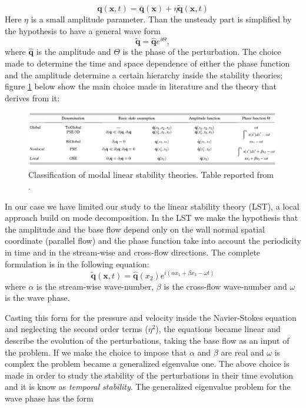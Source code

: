 $$ \mathbf{q} (\mathbf{x},t)= \overline{\mathbf{q}} (\mathbf{x}) + \eta \widetilde{\mathbf{q}} (\mathbf{x},t) $$
Here $\eta$ is a small amplitude parameter. Than the unsteady part is simplified by the hypothesis to have a general wave form
$$  \widetilde{\mathbf{q}} =  \widehat{\mathbf{q}} e^{i\Theta}, $$
where $\widehat{\mathbf{q}}$ is the amplitude and $\Theta$ is the phase of the perturbation.
The choice made to determine the time and space dependence of either the phase function and the amplitude determine a certain hierarchy inside the stability theories; figure \ref{fig:table} below show the main choice made in literature and the theory that derives from it:

\begin{figure}[h]
	\centering
	\includegraphics[width=1\linewidth]{chapter_1/table}
	\caption{Classification of modal linear stability theories. Table reported from \citet{juniper2014modal}.}
	\label{fig:table}
\end{figure}
 
In our case we have limited our study to the linear stability theory (LST), a local approach build on mode decomposition.
In the LST we make the hypothesis that the amplitude and the base flow depend only on the wall normal spatial coordinate (parallel flow) and the phase function take into account the periodicity in time and in the stream-wise and cross-flow directions.
The complete formulation is in the following equation:
 $$  \widetilde{\mathbf{q}}(\mathbf{x},t) =  \widehat{\mathbf{q}}(x_2) e^{i(\alpha x_1 + \beta x_3 - \omega t)}  $$ 
where $\alpha$ is the stream-wise wave-number, $\beta$ is the cross-flow wave-number and $\omega$ is the wave phase.

Casting this form for the pressure and velocity inside the Navier-Stokes equation and neglecting the second order terms ($\eta^2$), the equations became linear and  describe the evolution of the perturbations, taking the base flow as an input of the problem.
If we make the choice to impose that $\alpha$ and $\beta$ are real and $\omega$ is complex the problem became a generalized eigenvalue one.
The above choice is made in order to study the stability of the perturbations in their time evolution and it is know as \textit{temporal stability}.
The generalized eigenvalue problem for the wave phase has the form

